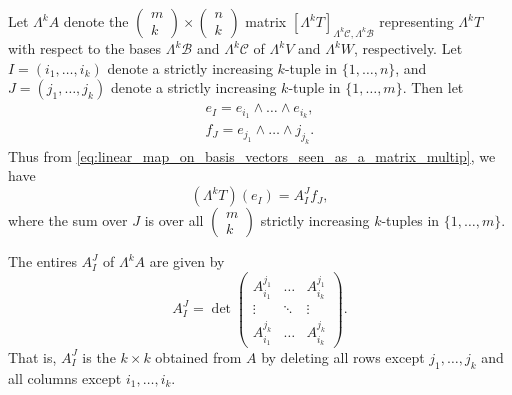 \documentclass[notoc,notitlepage]{tufte-book}
\begin{document}
Let $\Lambda^k A$ denote the $\left(\begin{smallmatrix} m \\ k \end{smallmatrix}\right)
\times \left(\begin{smallmatrix} n \\ k \end{smallmatrix}\right)$ matrix $[\Lambda^k
T]_{\Lambda^k \mathcal{C}, \Lambda^k \mathcal{B}}$ representing $\Lambda^k T$
with respect to the bases $\Lambda^k \mathcal{B}$ and $\Lambda^k \mathcal{C}$ of
$\Lambda^k V$ and $\Lambda^k W$, respectively. Let $I = (i_1, \ldots, i_k)$
denote a strictly increasing $k$-tuple in $\{ 1, \ldots, n \}$, and $J = (j_1,
\ldots, j_k)$ denote a strictly increasing $k$-tuple in $\{ 1, \ldots, m \}$.
Then let
\begin{gather*}
  e_I = e_{i_1} \land \hdots \land e_{i_k}, \\
  f_J = e_{j_1} \land \hdots \land j_{j_k}.
\end{gather*}
Thus from \cref{eq:linear_map_on_basis_vectors_seen_as_a_matrix_multip}, we have
\begin{equation}\label{eq:linear_map_on_decomp_k_forms_seen_as_a_matrix_multip}
  (\Lambda^k T)(e_I) = A^J_I f_J,
\end{equation}
where the sum over $J$ is over all $\left( \begin{smallmatrix} m \\ k
  \end{smallmatrix} \right)$ strictly increasing $k$-tuples in $\{ 1, \ldots, m
\}$.

\begin{propo}\label{propo:structure_of_the_determinant_of_a_linear_map_of_k_forms}
  The entires $A^J_I$ of $\Lambda^k A$ are given by
  \begin{equation}\label{eq:structure_of_the_determinant_of_a_linear_map_of_k_forms}
    A^J_I = \det \begin{pmatrix}
      A^{j_1}_{i_1} & \hdots & A^{j_1}_{i_k} \\
      \vdots & \ddots & \vdots \\
      A^{j_k}_{i_1} & \hdots & A^{j_k}_{i_k}
    \end{pmatrix}.
  \end{equation}
  That is, $A^J_I$ is the $k \times k$  obtained from $A$ by
  deleting all rows except $j_1, \ldots, j_k$ and all columns except $i_1,
  \ldots, i_k$.
\end{propo}
\end{document}
